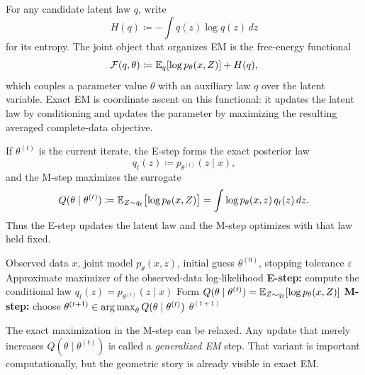 \documentclass[11pt]{article}
\begin{document}
For any candidate latent law $q$, write
\[
H(q)\coloneqq -\int q(z)\log q(z)\,dz
\]
for its entropy.
The joint object that organizes EM is the free-energy functional
\[
\mathcal{F}(q,\theta)
\coloneqq
\mathbb{E}_q[\log p_\theta(x,Z)] + H(q),
\]
which couples a parameter value $\theta$ with an auxiliary law $q$ over the latent variable.
Exact EM is coordinate ascent on this functional:
it updates the latent law by conditioning and updates the parameter by maximizing the resulting averaged complete-data objective.

If $\theta^{(t)}$ is the current iterate, the E-step forms the exact posterior law
\[
q_t(z)\coloneqq p_{\theta^{(t)}}(z\mid x),
\]
and the M-step maximizes the surrogate
\begin{equation}
  Q(\theta\mid \theta^{(t)})
  \coloneqq
  \mathbb{E}_{Z\sim q_t}\bigl[\log p_\theta(x,Z)\bigr]
  =
  \int \log p_\theta(x,z)\,q_t(z)\,dz.
  \label{eq:em-q-function}
\end{equation}
Thus the E-step updates the latent law and the M-step optimizes with that law held fixed.

\begin{algorithm}[H]
  \caption{Expectation--maximization (EM)}
  \label{alg:em}
  \begin{algorithmic}[1]
    \Require Observed data $x$, joint model $p_\theta(x,z)$, initial guess $\theta^{(0)}$, stopping tolerance $\varepsilon$
    \Ensure Approximate maximizer of the observed-data log-likelihood
      \State \textbf{E-step:} compute the conditional law $q_t(z)=p_{\theta^{(t)}}(z\mid x)$
      \State Form $Q(\theta\mid \theta^{(t)})=\mathbb{E}_{Z\sim q_t}\!\left[\log p_\theta(x,Z)\right]$
      \State \textbf{M-step:} choose $\theta^{(t+1)}\in\operatorname*{arg\,max}_{\theta} Q(\theta\mid \theta^{(t)})$
        \State \Return $\theta^{(t+1)}$
      \EndIf
    \EndFor
  \end{algorithmic}
\end{algorithm}

The exact maximization in the M-step can be relaxed.
Any update that merely increases $Q(\theta\mid\theta^{(t)})$ is called a \emph{generalized EM} step.
That variant is important computationally, but the geometric story is already visible in exact EM.
\end{document}
